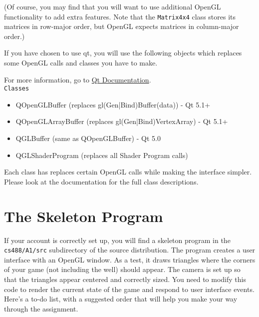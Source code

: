 (Of course, you may find that you will want to use additional OpenGL
functionality to add extra features.
Note that the \texttt{Matrix4x4} class stores its matrices in row-major
order, but OpenGL expects matrices in column-major order.)

If you have chosen to use qt, you will use the following objects which replaces
some OpenGL calls and classes you have to make.

For more information, go to \href{http://qt-project.org/doc/qt-5/index.html}{Qt
Documentation}. \\

\texttt{Classes}
\begin{itemize}
    \item QOpenGLBuffer (replaces gl(Gen|Bind)Buffer(data)) - Qt 5.1+
    \item QOpenGLArrayBuffer (replaces gl(Gen|Bind)VertexArray) - Qt 5.1+
    \item QGLBuffer (same as QOpenGLBuffer) - Qt 5.0
    \item QGLShaderProgram (replaces all Shader Program calls)
\end{itemize}

Each class has replaces certain OpenGL calls while making the interface simpler.
Please look at the documentation for the full class descriptions. \\

\iffalse
\subsection{Double buffering}

Your program should support both single and double buffering.  In single
buffering, graphics commands draw directly onto the screen.  In
double buffering, drawing happens on a ``back buffer'' that is then
swapped with the ``front buffer'' when drawing is complete. Because
the swapping happens quickly, the user never sees a half-complete rendering.

The OpenGL command \texttt{glDrawBuffer} lets you choose which buffer
to draw into.  The \texttt{QGLWidget} allows you to swap the
buffers, and this is already implemented for you in \texttt{viewer.cpp}
\fi

\section{The Skeleton Program}

If your account is correctly set up, you will find a skeleton
program in the \texttt{cs488/A1/src} subdirectory of the source
distribution.  The program creates a user interface
with an OpenGL window.   As a test, it draws triangles where the
corners of your game (not including the well) should appear.
The camera is set up so that the triangles appear centered and
correctly sized.
You need to modify this code to
render the current state of the game and respond to user interface
events.  Here's a to-do list, with a suggested order that will help
you make your way through the assignment.

